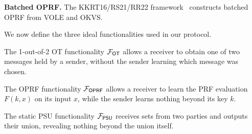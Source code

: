 \textbf{Batched OPRF.} The KKRT16/RS21/RR22 framework~\cite{KKRT16,RS21,RR22,HKL+24}
constructs batched OPRF from VOLE and OKVS.

We now define the three ideal functionalities used in our protocol.

The 1-out-of-2 OT functionality $\mathcal{F}_{\mathsf{OT}}$ allows a receiver to
obtain one of two messages held by a sender, without the sender learning
which message was chosen.

\smallskip
\begin{center}
\label{fig:f-ot}
\end{center}

The OPRF functionality $\mathcal{F}_{\mathsf{OPRF}}$ allows a receiver to learn the
PRF evaluation $F(k, x)$ on its input $x$, while the sender learns nothing
beyond its key $k$.

\begin{center}
\label{fig:f-oprf}
\end{center}

The static PSU functionality $\mathcal{F}_{\mathsf{PSU}}$ receives sets from two
parties and outputs their union, revealing nothing beyond the union itself.

